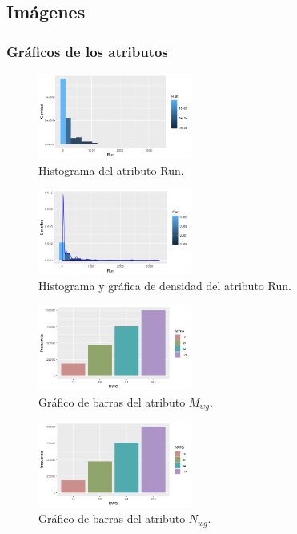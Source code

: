 \documentclass[osajnl,twocolumn,showpacs,superscriptaddress,10pt]{revtex4-1} %
\begin{document}
\subsection{Imágenes}

\subsubsection{Gráficos de los atributos} \label{apendix:images:attr}

\twocolumngrid

\begin{figure}[H]
    \centering
    \includegraphics[width=0.45\textwidth]{plots/run_hist}
    \caption{Histograma del atributo Run.}
    \label{figure:run_hist}
\end{figure}

\begin{figure}[H]
    \centering
    \includegraphics[width=0.45\textwidth]{plots/run_density}
    \caption{Histograma y gráfica de densidad del atributo Run.}
    \label{figure:run_density}
\end{figure}

\begin{figure}[H]
    \centering
    \includegraphics[width=0.45\textwidth]{plots/mwg_bar}
    \caption{Gráfico de barras del atributo $M_{wg}$.}
    \label{figure:mwg_bar}
\end{figure}

\begin{figure}[H]
    \centering
    \includegraphics[width=0.45\textwidth]{plots/nwg_bar}
    \caption{Gráfico de barras del atributo $N_{wg}$.}
    \label{figure:nwg_bar}
\end{figure}
\end{document}

